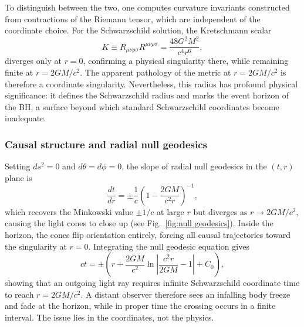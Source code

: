 To distinguish between the two, one computes curvature invariants constructed from contractions of the Riemann tensor, which are independent of the coordinate choice. For the Schwarzschild solution, the Kretschmann scalar
\begin{equation}
K \equiv R_{\mu\nu\rho\sigma}R^{\mu\nu\rho\sigma} = \frac{48G^2M^{2}}{c^4 r^{6}},
\end{equation}
diverges only at $r=0$, confirming a physical singularity there, while remaining finite at $r=2GM/c^2$. The apparent pathology of the metric at $r=2GM/c^2$ is therefore a coordinate singularity. Nevertheless, this radius has profound physical significance: it defines the Schwarzschild radius and marks the event horizon of the BH, a surface beyond which
standard Schwarzschild coordinates become inadequate.

\subsubsection{Causal structure and radial null geodesics}

Setting $ds^2 = 0$ and $d\theta = d\phi = 0$, the slope of radial null geodesics in the $(t,r)$ plane is
\begin{equation}
\frac{dt}{dr} = \pm \frac{1}{c}\left(1 - \frac{2GM}{c^2 r}\right)^{-1},
\end{equation}
which recovers the Minkowski value $\pm 1/c$ at large $r$ but diverges as $r \to 2GM/c^2$, causing the light cones to close up
(see Fig.~\ref{fig:null geodesics}). Inside the horizon, the cones flip orientation entirely, forcing all causal trajectories toward the singularity at $r=0$. Integrating the null geodesic equation gives
\begin{equation}
ct = \pm \left(r + \frac{2GM}{c^2} \ln\left|\frac{c^2 r}{2GM} - 1\right| + C_0 \right),
\end{equation}
showing that an outgoing light ray requires infinite Schwarzschild coordinate time to reach $r=2GM/c^2$. A distant observer therefore sees an infalling body freeze and fade at the horizon, while in proper time the crossing occurs in a finite interval. The issue lies in the coordinates, not the physics.

